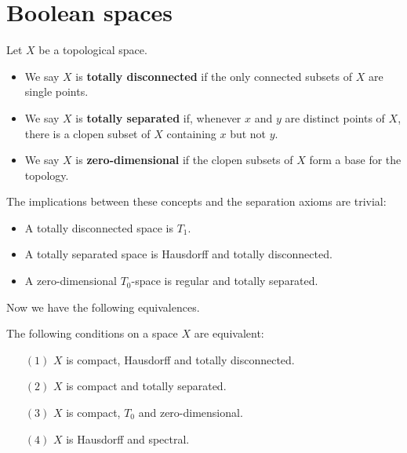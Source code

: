 \section{Boolean spaces}
\begin{definition}
Let $X$ be a topological space.
\begin{itemize}
\item We say $X$ is \textbf{totally disconnected} if the only connected subsets of $X$ are single points.
\item We say $X$ is \textbf{totally separated} if, whenever $x$ and $y$ are distinct points of $X$, there is a clopen subset of $X$ containing $x$ but not $y$.
\item We say $X$ is \textbf{zero-dimensional} if the clopen subsets of $X$ form a base for the topology.
\end{itemize}
\end{definition}
The implications between these concepts and the separation axioms are trivial:
\begin{lemma}
\begin{itemize}
\item A totally disconnected space is $T_1$.
\item A totally separated space is Hausdorff and totally disconnected.
\item A zero-dimensional $T_0$-space is regular and totally separated.
\end{itemize}
\end{lemma}
Now we have the following equivalences.
\begin{theorem}
The following conditions on a space $X$ are equivalent:
\begin{itemize}
\item[$(1)$] $X$ is compact, Hausdorff and totally disconnected.
\item[$(2)$] $X$ is compact and totally separated.
\item[$(3)$] $X$ is compact, $T_0$ and zero-dimensional.
\item[$(4)$] $X$ is Hausdorff and spectral.
\end{itemize}
\end{theorem}
